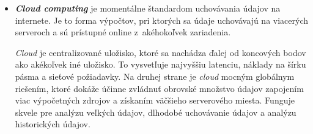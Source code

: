 \begin{itemize}
    
    \item \textit{\textbf{Cloud computing}} je momentálne štandardom uchovávania údajov na internete. 
    Je to forma výpočtov, pri ktorých sa údaje uchovávajú na viacerých serveroch a sú prístupné online z~akéhokoľvek zariadenia.~\cite{teamDigetum_2022}
    
    \emph{Cloud} je centralizované uložisko, ktoré sa nachádza ďalej od koncových bodov ako akékoľvek iné uložisko. 
    To vysvetľuje najvyššiu latenciu, náklady na šírku pásma a sieťové požiadavky. 
    Na druhej strane je \emph{cloud} mocným globálnym riešením, ktoré dokáže účinne zvládnuť obrovské množstvo údajov zapojením viac výpočetných zdrojov a získaním väčšieho serverového miesta.
    Funguje skvele pre analýzu veľkých údajov, dlhodobé uchovávanie údajov a analýzu historických údajov.~\cite{teamDigetum_2022}
\end{itemize}
